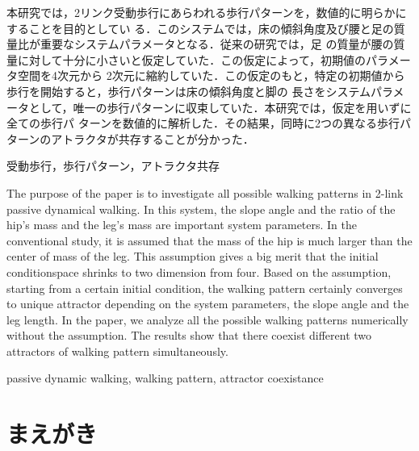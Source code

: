 \documentclass[technicalreport]{ieicej}
\begin{document}
\begin{jabstract}
本研究では，2リンク受動歩行にあらわれる歩行パターンを，数値的に明らかにすることを目的としてい
る．このシステムでは，床の傾斜角度及び腰と足の質量比が重要なシステムパラメータとなる．従来の研究では，足
の質量が腰の質量に対して十分に小さいと仮定していた．この仮定によって，初期値のパラメータ空間を4次元から
2次元に縮約していた．この仮定のもと，特定の初期値から歩行を開始すると，歩行パターンは床の傾斜角度と脚の
長さをシステムパラメータとして，唯一の歩行パターンに収束していた．本研究では，仮定を用いずに全ての歩行パ
ターンを数値的に解析した．その結果，同時に2つの異なる歩行パターンのアトラクタが共存することが分かった．
\end{jabstract}
\begin{jkeyword}
受動歩行，歩行パターン，アトラクタ共存
\end{jkeyword}
%
%
\begin{eabstract}
The purpose of the paper is to investigate all possible walking patterns in 2-link passive dynamical
walking. In this system, the slope angle and the ratio of the hip's mass and the leg's mass are important system
parameters. In the conventional study, it is assumed that the mass of the hip is much larger than the center of
mass of the leg. This assumption gives a big merit that the initial conditionspace shrinks to two dimension from
four. Based on the assumption, starting from a certain initial condition, the walking pattern certainly converges to
unique attractor depending on the system parameters, the slope angle and the leg length. In the paper, we analyze
all the possible walking patterns numerically without the assumption. The results show that there coexist different
two attractors of walking pattern simultaneously.
\end{eabstract}
\begin{ekeyword}
passive dynamic walking,
walking pattern, attractor coexistance
\end{ekeyword}
\maketitle
\newblock
\newpage
\newblock
\newpage

%
%
\section{まえがき}
\end{document}
